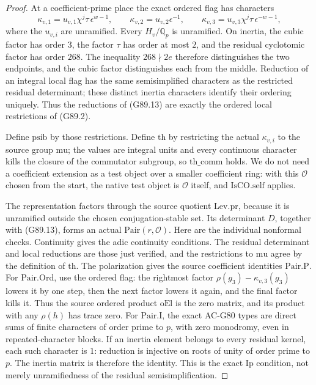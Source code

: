 \begin{proof}
At a coefficient-prime place the exact ordered flag has characters
\[
 \kappa_{v,1}=u_{v,1}\chi^j\tau\,\epsilon^{w-1},
 \qquad
 \kappa_{v,2}=u_{v,2}\epsilon^{-1},
 \qquad
 \kappa_{v,3}=u_{v,3}\chi^j\tau\,\epsilon^{-w-1},
                                                        \tag{G89.13}
\]
where the \(u_{v,i}\) are unramified.
Every \(H_v/\mathbb Q_p\) is unramified.
On inertia, the cubic factor has order \(3\), the factor
\(\tau\) has order at most \(2\), and the residual cyclotomic
factor has order \(268\).
The inequality \(268\nmid2e\) therefore distinguishes the
two endpoints, and the cubic factor distinguishes each from
the middle.
Reduction of an integral local flag has the same semisimplified
characters as the restricted residual determinant; these
distinct inertia characters identify their ordering uniquely.
Thus the reductions of (G89.13) are exactly the ordered local
restrictions of (G89.2).

Define \(\mathrm{psib}\) by those restrictions.
Define \(\mathrm{th}\) by restricting the actual \(\kappa_{v,i}\)
to the source group \(\mathrm{mu}\); the values are integral
units and every continuous character kills the closure of the
commutator subgroup, so \(\mathrm{th\_comm}\) holds.
We do not need a coefficient extension as a test object over
a smaller coefficient ring: with this \(\mathcal O\) chosen
from the start, the native test object is \(\mathcal O\)
itself, and \(\mathrm{IsCO.self}\) applies.

The representation factors through the source quotient
\(\mathrm{Lev.pr}\), because it is unramified outside the
chosen conjugation-stable set.
Its determinant \(D\), together with (G89.13), forms an actual
\(\mathrm{Pair}(r,\mathcal O)\).
Here are the individual nonformal checks.
Continuity gives the adic continuity conditions.
The residual determinant and local reductions are those just
verified, and the restrictions to \(\mathrm{mu}\) agree by
the definition of \(\mathrm{th}\).
The polarization gives the source coefficient identities
\(\mathrm{Pair.P}\).
For \(\mathrm{Pair.Ord}\), use the ordered flag:
the rightmost factor
\(\rho(g_3)-\kappa_{v,3}(g_3)\) lowers it by one step,
then the next factor lowers it again, and the final factor
kills it.  Thus the source ordered product \(\mathrm{oEl}\)
is the zero matrix, and its product with any \(\rho(h)\)
has trace zero.
For \(\mathrm{Pair.I}\), the exact AC-G80 types are direct
sums of finite characters of order prime to \(p\), with
zero monodromy, even in repeated-character blocks.
If an inertia element belongs to every residual kernel,
each such character is \(1\): reduction is injective on
roots of unity of order prime to \(p\).
The inertia matrix is therefore the identity.
This is the exact \(\mathrm{Ip}\) condition, not merely
unramifiedness of the residual semisimplification.


\end{proof}
